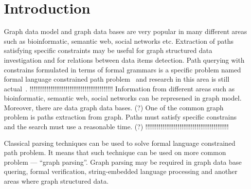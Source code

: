 \documentclass{sig-alternate} %
\begin{document}
\section{Introduction}
Graph data model and graph data bases are very popular in many different areas such as bioinformatic, semantic web, social networks etc.
Extraction of paths satisfying specific constraints may be useful for graph structured data investigation and for relations between data items detection.
Path querying with constrains formulated in terms of formal grammars is a specific problem named formal language constrained path problem~\cite{FLCpathProblem} and research in this area is still actual~\cite{DirOfBigGraphAnalysis}.
!!!!!!!!!!!!!!!!!!!!!!!!!!!!!!!!!!!!!!!!!!!!
Information from different areas such as bioinformatic, semantic web, social networks can be represened in graph model. 
Moreover, there are data graph data bases. (?) One of the common graph problem is paths extraction from graph. 
Paths must satisfy specific constrains and the search must use a reasonable time. (?)     
!!!!!!!!!!!!!!!!!!!!!!!!!!!!!!!!!!!!!!!!!!!!

Classical parsing techniques can be used to solve formal language constrained path problem. 
It means that such technique can be used on more common problem --- ``graph parsing''. 
Graph parsing may be required in graph data base quering, formal verification, string-embedded language processing and another areas where graph structured data. 
\end{document}
